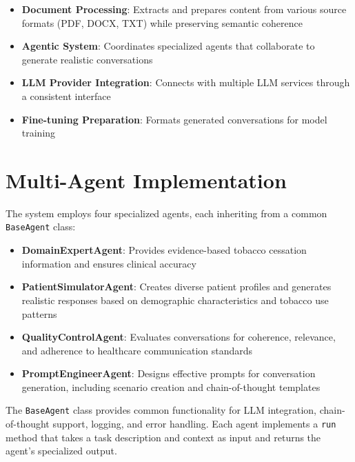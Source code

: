\begin{itemize}
    \item \textbf{Document Processing}: Extracts and prepares content from various source formats (PDF, DOCX, TXT) while preserving semantic coherence
    
    \item \textbf{Agentic System}: Coordinates specialized agents that collaborate to generate realistic conversations
    
    \item \textbf{LLM Provider Integration}: Connects with multiple LLM services through a consistent interface
    
    \item \textbf{Fine-tuning Preparation}: Formats generated conversations for model training
\end{itemize}

\section{Multi-Agent Implementation}

The system employs four specialized agents, each inheriting from a common \texttt{BaseAgent} class:

\begin{itemize}
    \item \textbf{DomainExpertAgent}: Provides evidence-based tobacco cessation information and ensures clinical accuracy
    
    \item \textbf{PatientSimulatorAgent}: Creates diverse patient profiles and generates realistic responses based on demographic characteristics and tobacco use patterns
    
    \item \textbf{QualityControlAgent}: Evaluates conversations for coherence, relevance, and adherence to healthcare communication standards
    
    \item \textbf{PromptEngineerAgent}: Designs effective prompts for conversation generation, including scenario creation and chain-of-thought templates
\end{itemize}

The \texttt{BaseAgent} class provides common functionality for LLM integration, chain-of-thought support, logging, and error handling. Each agent implements a \texttt{run} method that takes a task description and context as input and returns the agent's specialized output.

